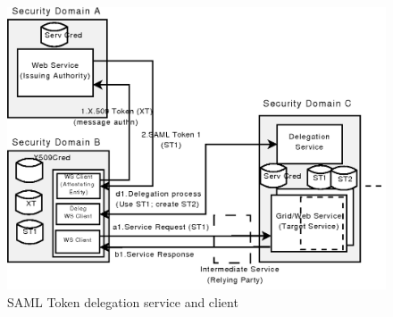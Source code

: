 \documentclass[twocolumn]{svjour3}         %
\begin{document}
\begin{figure}
\includegraphics[width=0.9\columnwidth]{SAMLDelegation.png}
\caption{SAML Token delegation service and client}
\label{fig:SAMLDelegation}
\end{figure}
\end{document}
